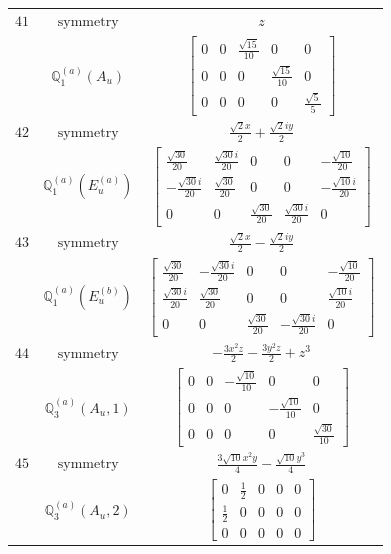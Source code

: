 \documentclass[fleqn,8pt,landscape]{jsarticle}
\begin{document}
\begin{longtable}{ccc}
$ 41 $ & $ \text{symmetry} $ & $ z $ \\
$  $ & $ \mathbb{Q}_{1}^{(a)}(A_{u}) $ & $ \begin{bmatrix} 0 & 0 & \frac{\sqrt{15}}{10} & 0 & 0 \\ 0 & 0 & 0 & \frac{\sqrt{15}}{10} & 0 \\ 0 & 0 & 0 & 0 & \frac{\sqrt{5}}{5} \end{bmatrix} $ \\ \hline
$ 42 $ & $ \text{symmetry} $ & $ \frac{\sqrt{2} x}{2} + \frac{\sqrt{2} i y}{2} $ \\
$  $ & $ \mathbb{Q}_{1}^{(a)}(E_{u}^{(a)}) $ & $ \begin{bmatrix} \frac{\sqrt{30}}{20} & \frac{\sqrt{30} i}{20} & 0 & 0 & - \frac{\sqrt{10}}{20} \\ - \frac{\sqrt{30} i}{20} & \frac{\sqrt{30}}{20} & 0 & 0 & - \frac{\sqrt{10} i}{20} \\ 0 & 0 & \frac{\sqrt{30}}{20} & \frac{\sqrt{30} i}{20} & 0 \end{bmatrix} $ \\ \hline
$ 43 $ & $ \text{symmetry} $ & $ \frac{\sqrt{2} x}{2} - \frac{\sqrt{2} i y}{2} $ \\
$  $ & $ \mathbb{Q}_{1}^{(a)}(E_{u}^{(b)}) $ & $ \begin{bmatrix} \frac{\sqrt{30}}{20} & - \frac{\sqrt{30} i}{20} & 0 & 0 & - \frac{\sqrt{10}}{20} \\ \frac{\sqrt{30} i}{20} & \frac{\sqrt{30}}{20} & 0 & 0 & \frac{\sqrt{10} i}{20} \\ 0 & 0 & \frac{\sqrt{30}}{20} & - \frac{\sqrt{30} i}{20} & 0 \end{bmatrix} $ \\ \hline
$ 44 $ & $ \text{symmetry} $ & $ - \frac{3 x^{2} z}{2} - \frac{3 y^{2} z}{2} + z^{3} $ \\
$  $ & $ \mathbb{Q}_{3}^{(a)}(A_{u},1) $ & $ \begin{bmatrix} 0 & 0 & - \frac{\sqrt{10}}{10} & 0 & 0 \\ 0 & 0 & 0 & - \frac{\sqrt{10}}{10} & 0 \\ 0 & 0 & 0 & 0 & \frac{\sqrt{30}}{10} \end{bmatrix} $ \\ \hline
$ 45 $ & $ \text{symmetry} $ & $ \frac{3 \sqrt{10} x^{2} y}{4} - \frac{\sqrt{10} y^{3}}{4} $ \\
$  $ & $ \mathbb{Q}_{3}^{(a)}(A_{u},2) $ & $ \begin{bmatrix} 0 & \frac{1}{2} & 0 & 0 & 0 \\ \frac{1}{2} & 0 & 0 & 0 & 0 \\ 0 & 0 & 0 & 0 & 0 \end{bmatrix} $ \\ \hline

\end{longtable}
\end{document}
